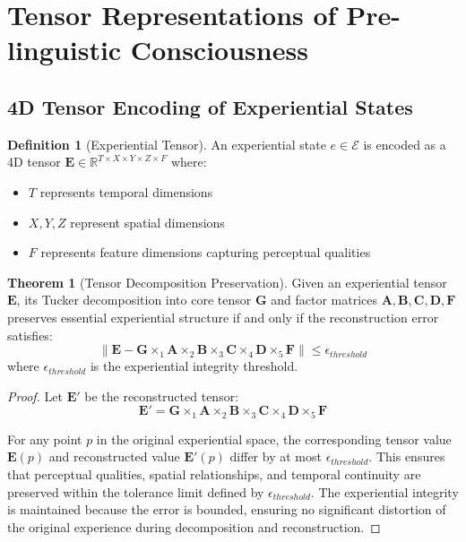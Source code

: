 \documentclass[11pt]{article}
\theoremstyle{definition}
\newtheorem{definition}{Definition}
\newtheorem{theorem}{Theorem}
\begin{document}
\section{Tensor Representations of Pre-linguistic Consciousness}

\subsection{4D Tensor Encoding of Experiential States}

\begin{definition}[Experiential Tensor]
An experiential state $e \in \mathcal{E}$ is encoded as a 4D tensor $\mathbf{E} \in \mathbb{R}^{T \times X \times Y \times Z \times F}$ where:
\begin{itemize}
    \item $T$ represents temporal dimensions
    \item $X, Y, Z$ represent spatial dimensions
    \item $F$ represents feature dimensions capturing perceptual qualities
\end{itemize}
\end{definition}

\begin{theorem}[Tensor Decomposition Preservation]
Given an experiential tensor $\mathbf{E}$, its Tucker decomposition into core tensor $\mathbf{G}$ and factor matrices $\mathbf{A}, \mathbf{B}, \mathbf{C}, \mathbf{D}, \mathbf{F}$ preserves essential experiential structure if and only if the reconstruction error satisfies:
\begin{equation}
\| \mathbf{E} - \mathbf{G} \times_1 \mathbf{A} \times_2 \mathbf{B} \times_3 \mathbf{C} \times_4 \mathbf{D} \times_5 \mathbf{F} \| \leq \epsilon_{threshold}
\end{equation}
where $\epsilon_{threshold}$ is the experiential integrity threshold.
\end{theorem}

\begin{proof}
Let $\mathbf{E}'$ be the reconstructed tensor:
\begin{equation}
\mathbf{E}' = \mathbf{G} \times_1 \mathbf{A} \times_2 \mathbf{B} \times_3 \mathbf{C} \times_4 \mathbf{D} \times_5 \mathbf{F}
\end{equation}

For any point $p$ in the original experiential space, the corresponding tensor value $\mathbf{E}(p)$ and reconstructed value $\mathbf{E}'(p)$ differ by at most $\epsilon_{threshold}$. This ensures that perceptual qualities, spatial relationships, and temporal continuity are preserved within the tolerance limit defined by $\epsilon_{threshold}$. The experiential integrity is maintained because the error is bounded, ensuring no significant distortion of the original experience during decomposition and reconstruction.
\end{proof}
\end{document}
